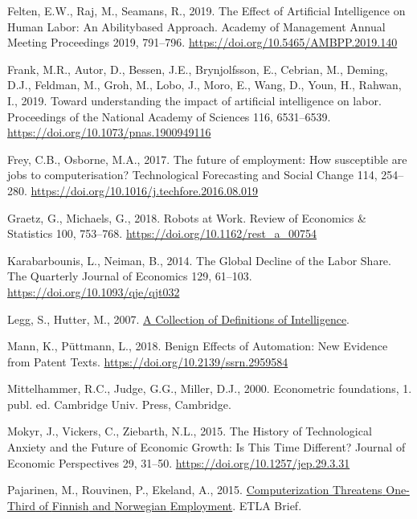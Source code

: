 \documentclass[
  11,
  a4paperpaper,
]{article}
\newlength{\cslhangindent}
\newenvironment{CSLReferences}[2] %
 {\begin{list}{}{%
  \setlength{\itemindent}{0pt}
  \setlength{\leftmargin}{0pt}
  \setlength{\parsep}{0pt}
  \ifodd #1
   \setlength{\leftmargin}{\cslhangindent}
   \setlength{\itemindent}{-1\cslhangindent}
  \fi
  \setlength{\itemsep}{#2\baselineskip}}}
 {\end{list}}
\begin{document}
\begin{CSLReferences}{1}{0}
Felten, E.W., Raj, M., Seamans, R., 2019. The {Effect} of {Artificial}
{Intelligence} on {Human} {Labor}: {An} {Abilitybased} {Approach}.
Academy of Management Annual Meeting Proceedings 2019, 791--796.
\url{https://doi.org/10.5465/AMBPP.2019.140}

Frank, M.R., Autor, D., Bessen, J.E., Brynjolfsson, E., Cebrian, M.,
Deming, D.J., Feldman, M., Groh, M., Lobo, J., Moro, E., Wang, D., Youn,
H., Rahwan, I., 2019. Toward understanding the impact of artificial
intelligence on labor. Proceedings of the National Academy of Sciences
116, 6531--6539. \url{https://doi.org/10.1073/pnas.1900949116}

Frey, C.B., Osborne, M.A., 2017. The future of employment: {How}
susceptible are jobs to computerisation? Technological Forecasting and
Social Change 114, 254--280.
\url{https://doi.org/10.1016/j.techfore.2016.08.019}

Graetz, G., Michaels, G., 2018. Robots at {Work}. Review of Economics \&
Statistics 100, 753--768. \url{https://doi.org/10.1162/rest_a_00754}

Karabarbounis, L., Neiman, B., 2014. The {Global} {Decline} of the
{Labor} {Share}. The Quarterly Journal of Economics 129, 61--103.
\url{https://doi.org/10.1093/qje/qjt032}

Legg, S., Hutter, M., 2007. \href{http://arxiv.org/abs/0706.3639}{A
{Collection} of {Definitions} of {Intelligence}}.

Mann, K., Püttmann, L., 2018. Benign {Effects} of {Automation}: {New}
{Evidence} from {Patent} {Texts}.
\url{https://doi.org/10.2139/ssrn.2959584}

Mittelhammer, R.C., Judge, G.G., Miller, D.J., 2000. Econometric
foundations, 1. publ. ed. Cambridge Univ. Press, Cambridge.

Mokyr, J., Vickers, C., Ziebarth, N.L., 2015. The {History} of
{Technological} {Anxiety} and the {Future} of {Economic} {Growth}: {Is}
{This} {Time} {Different}? Journal of Economic Perspectives 29, 31--50.
\url{https://doi.org/10.1257/jep.29.3.31}

Pajarinen, M., Rouvinen, P., Ekeland, A., 2015.
\href{https://ideas.repec.org//p/rif/briefs/34.html}{Computerization
{Threatens} {One}-{Third} of {Finnish} and {Norwegian} {Employment}}.
ETLA Brief.


\end{CSLReferences}
\end{document}
